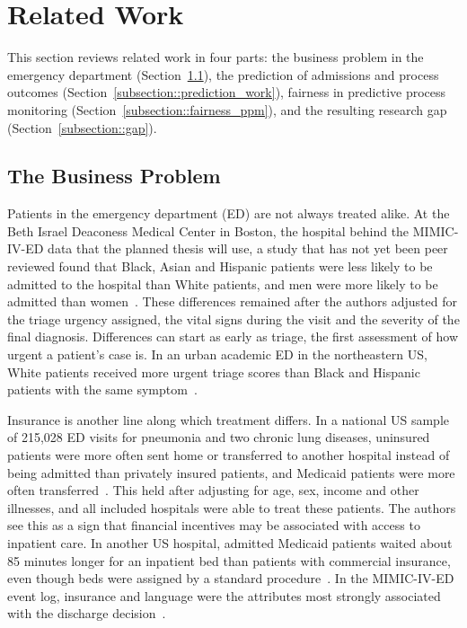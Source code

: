 \section{Related Work}\label{section::related_work}

This section reviews related work in four parts: the business problem in the emergency department (Section~\ref{subsection::business_problem}), the prediction of admissions and process outcomes (Section~\ref{subsection::prediction_work}), fairness in predictive process monitoring (Section~\ref{subsection::fairness_ppm}), and the resulting research gap (Section~\ref{subsection::gap}).

\subsection{The Business Problem}\label{subsection::business_problem}

Patients in the emergency department (ED) are not always treated alike. At the Beth Israel Deaconess Medical Center in Boston, the hospital behind the MIMIC-IV-ED data that the planned thesis will use, a study that has not yet been peer reviewed found that Black, Asian and Hispanic patients were less likely to be admitted to the hospital than White patients, and men were more likely to be admitted than women~\cite{coggan2025demographic}. These differences remained after the authors adjusted for the triage urgency assigned, the vital signs during the visit and the severity of the final diagnosis. Differences can start as early as triage, the first assessment of how urgent a patient's case is. In an urban academic ED in the northeastern US, White patients received more urgent triage scores than Black and Hispanic patients with the same symptom~\cite{joseph2022association}.

Insurance is another line along which treatment differs. In a national US sample of 215,028 ED visits for pneumonia and two chronic lung diseases, uninsured patients were more often sent home or transferred to another hospital instead of being admitted than privately insured patients, and Medicaid patients were more often transferred~\cite{venkatesh2019association}. This held after adjusting for age, sex, income and other illnesses, and all included hospitals were able to treat these patients. The authors see this as a sign that financial incentives may be associated with access to inpatient care. In another US hospital, admitted Medicaid patients waited about 85 minutes longer for an inpatient bed than patients with commercial insurance, even though beds were assigned by a standard procedure~\cite{prucnal2025patterns}. In the MIMIC-IV-ED event log, insurance and language were the attributes most strongly associated with the discharge decision~\cite{andreswari2026fairness}.


